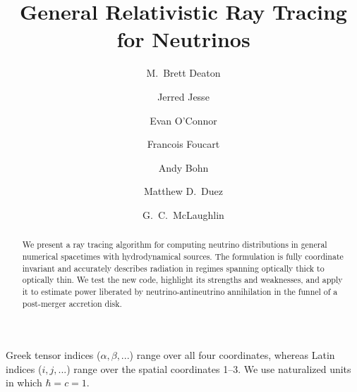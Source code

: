 \documentclass[aps,prd,twocolumn,superscriptaddress,groupedaddress]{revtex4}
\begin{document}
\widetext
{}

\title{General Relativistic Ray Tracing for Neutrinos}

\author{M.\ Brett Deaton}

\author{Jerred Jesse}

\author{Evan O'Connor}

\author{Francois Foucart}

\author{Andy Bohn}

\author{Matthew D.\ Duez}

\author{G.\ C.\ McLaughlin}


\begin{abstract}
  We present a ray tracing algorithm for computing neutrino distributions in
  general numerical spacetimes with hydrodynamical sources.
  The formulation is fully coordinate invariant and accurately describes
  radiation in regimes spanning optically thick to optically thin.
  We test the new code, highlight its strengths and weaknesses, and
  apply it to estimate power
  liberated by neutrino-antineutrino annihilation in the funnel of a
  post-merger accretion disk.
\end{abstract}

\maketitle

Greek tensor indices ($\alpha, \beta, ...$) range over all four coordinates,
whereas Latin indices ($i, j, ...$) range over the spatial coordinates 1--3.
We use naturalized units in which $\hbar=c=1$.
\end{document}
